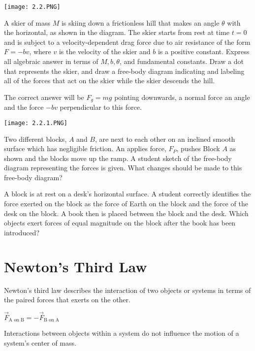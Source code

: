 \documentclass[../mech.tex]{subfiles}
\begin{document}
\begin{example}
    \begin{center}
        \texttt{[image: 2.2.PNG]}
    \end{center}
    A skier of mass $M$ is skiing down a frictionless hill that makes an angle $\theta$ with the horizontal, as shown in the diagram. The skier starts from rest at time $t=0$ and is subject to a velocity-dependent drag force due to air 
    resistance of the form $F=-bv$, where $v$ is the velocity of the skier and $b$ is a positive constant. Express all algebraic answer in terms of $M, b, \theta$, and fundamental constants. Draw a dot that represents the skier, and draw a free-body
    diagram indicating and labeling all of the forces that act on the skier while the skier descends the hill.

    The correct answer will be $F_g=mg$ pointing downwards, a normal force an angle and the force $-bv$ perpendicular to this force. 
\end{example}

\ex \begin{center}
    \texttt{[image: 2.2.1.PNG]}
\end{center}
Two different blocks, $A$ and $B$, are next to each other on an inclined smooth surface which has negligible friction. An applies force, $F_P$, pushes Block $A$ as shown and the blocks move up the ramp. A student sketch of the free-body diagram representing the forces 
is given. What changes should be made to this free-body diagram?

\ex A block is at rest on a desk's horizontal surface. A student correctly identifies the force exerted on the block as the force of Earth on the block and the force of the desk on the block.
A book then is placed between the block and the desk. Which objects exert forces of equal magnitude on the block after the book has been introduced?

\section{Newton's Third Law}
Newton's third law describes the interaction of two objects or systems in terms of the paired forces that exerts on the other.
\begin{center}
    $\vec{F}_{\text{A on B}} = -\vec{F}_{\text{B on A}}$
\end{center}
Interactions between objects within a system do not influence the motion of a system's center of mass.
\end{document}
